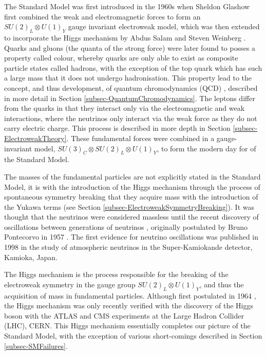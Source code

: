 The Standard Model was first introduced in the 1960s when Sheldon Glashow first combined the weak and electromagnetic forces \cite{
Glashow:1961tr} to form an $SU(2)_L \otimes U(1)_Y$ gauge invariant electroweak model, which was then extended to incorporate the Higgs 
mechanism by Abdus Salam and Steven Weinberg \cite{PhysRevLett.19.1264, Salam:1959zz}. Quarks and gluons (the quanta of the strong force) were 
later found to posses a property called colour, whereby quarks are only able to exist as composite particle states called hadrons, with the 
exception of the top quark which has such a large mass that it does not undergo hadronisation. This property lead to the concept, and thus 
development, of quantum chromodynamics (QCD) \cite{GellMann:1964nj,PhysRevD.8.3633, PhysRevLett.30.1346}, described in more detail in Section 
\ref{subsec-QuantumChromodynamics}. The leptons differ from the quarks in that they interact only via the electromagnetic and weak 
interactions, where the neutrinos only interact via the weak force as they do not carry electric charge. This process is described in more 
depth in Section \ref{subsec-ElectroweakTheory}. These fundamental forces were combined in a gauge-invariant model, $SU(3)_C \otimes SU(2)_L \otimes U(1)_Y$,
to form the modern day for of the Standard Model. 

The masses of the fundamental particles are not explicitly stated in the Standard Model, it is with the introduction of the Higgs mechanism 
through the process of spontaneous symmetry breaking that they acquire mass with the introduction of the Yukawa terms (see Section \ref{subsec-ElectroweakSymmetryBreaking}).
It was thought that the neutrinos were considered massless until the recent discovery of oscillations between 
generations of neutrinos \cite{PhysRevLett.81.1562}, originally postulated by Bruno Pontecorvo in 1957 \cite{Pontecorvo:1967fh}. The first 
evidence for neutrino oscillations was published in 1998 in the study of atmospheric neutrinos in the Super-Kamiokande detector, Kamioka, 
Japan. 

The Higgs mechanism is the process responsible for the breaking of the electroweak symmetry in the gauge group $SU(2)_L \otimes U(1)_Y$, and 
thus the acquisition of mass in fundamental particles. Although first postulated in 1964 \cite{PhysRevLett.13.508, PhysRevLett.13.321, 
PhysRevLett.13.585}, the Higgs mechanism was only recently verified with the discovery of the Higgs boson with the ATLAS \cite{Aad:2012tfa} and 
CMS \cite{b846af59f42d440a9058d93ed5df44cf} experiments at the Large Hadron Collider (LHC), CERN. This Higgs mechanism essentially completes 
our picture of the Standard Model, with the exception of various short-comings described in Section \ref{subsec-SMFailures}.


